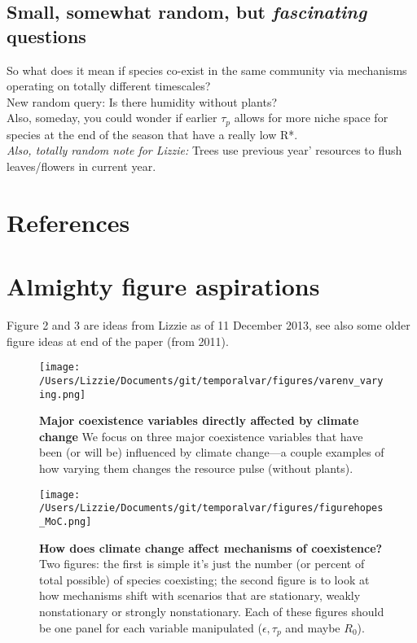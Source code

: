 \documentclass[11pt,a4paper,oneside]{article}
\begin{document}
\subsection{Small, somewhat random, but \emph{fascinating} questions} 
\noindent So what does it mean if species co-exist in the same community via mechanisms operating on totally different timescales?\\

\noindent  New random query: Is there humidity without plants?\\

\noindent  Also, someday, you could wonder if earlier \(\tau_{p}\) allows for more niche space for species at the end of the season that have a really low R*.\\

\noindent  \emph{Also, totally random note for Lizzie:} Trees use previous year' resources to flush leaves/flowers in current year.



\newpage
\section{References}



\newpage
\section{Almighty figure aspirations} 
\noindent Figure 2 and 3 are ideas from Lizzie as of 11 December 2013, see also some older figure ideas at end of the paper (from 2011). 

\begin{figure}[h!]
\centering
\noindent \texttt{[image: /Users/Lizzie/Documents/git/temporalvar/figures/varenv\_varying.png]}
\caption{{\bf Major coexistence variables directly affected by
    climate change}  We focus on three major coexistence variables
  that have been (or will be) influenced by climate change---a couple
  examples of how varying them changes the resource pulse (without plants).}
\end{figure}

\newpage
\begin{figure}[h!]
\centering
\noindent \texttt{[image: /Users/Lizzie/Documents/git/temporalvar/figures/figurehopes\_MoC.png]}
\caption{{\bf How does climate change affect mechanisms of coexistence?} Two figures: the first is simple it's just the number (or percent of total possible) of species coexisting; the second figure is to look at how mechanisms shift with scenarios that are stationary, weakly nonstationary or strongly nonstationary. Each of these figures should be one panel for each variable manipulated (\(\epsilon, \tau_{p}\) and maybe \(R_{0}\)).}
\end{figure}
\end{document}
